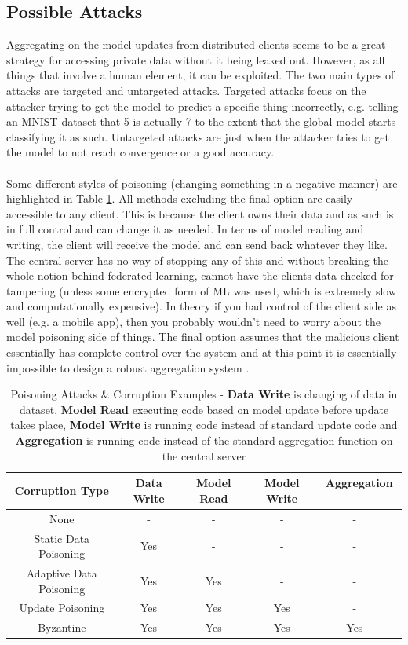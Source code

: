 \subsection{Possible Attacks}
Aggregating on the model updates from distributed clients seems to be a great strategy for accessing private data without it being leaked out. 
However, as all things that involve a human element, it can be exploited. 
The two main types of attacks are targeted and untargeted attacks.
Targeted attacks focus on the attacker trying to get the model to predict a specific thing incorrectly, e.g. telling an MNIST dataset that 5 is actually 7 to the extent that the global model starts classifying it as such. 
Untargeted attacks are just when the attacker tries to get the model to not reach convergence or a good accuracy.
\\ \\
Some different styles of poisoning (changing something in a negative manner) are highlighted in Table \ref{tbl:poisoning}. 
All methods excluding the final option are easily accessible to any client.
This is because the client owns their data and as such is in full control and can change it as needed. 
In terms of model reading and writing, the client will receive the model and can send back whatever they like. 
The central server has no way of stopping any of this and without breaking the whole notion behind federated learning, cannot have the clients data checked for tampering (unless some encrypted form of ML was used, which is extremely slow and computationally expensive). 
In theory if you had control of the client side as well (e.g. a mobile app), then you probably wouldn't need to worry about the model poisoning side of things. 
The final option assumes that the malicious client essentially has complete control over the system and at this point it is essentially impossible to design a robust aggregation system \cite{robagg_fl}.
\begin{center}
    \begin{longtable}{ |c|c|c|c|c| }
    \caption{Poisoning Attacks \& Corruption Examples \cite{robagg_fl} - \textbf{Data Write} is changing of data in dataset, \textbf{Model Read} executing code based on model update before update takes place, \textbf{Model Write} is running code instead of standard update code and \textbf{Aggregation} is running code instead of the standard aggregation function on the central server}
    \label{tbl:poisoning}
    \hline
    \textbf{Corruption Type} & \textbf{Data Write} & \textbf{Model Read} & \textbf{Model Write} & \textbf{Aggregation} \ \\ \hline
    None & - & - & - & - \ \\ \hline
    Static Data Poisoning & Yes & - & - & - \ \\ \hline
    Adaptive Data Poisoning & Yes & Yes & - & - \ \\ \hline
    Update Poisoning & Yes & Yes & Yes & - \ \\ \hline
    Byzantine & Yes & Yes & Yes & Yes \ \\ \hline
    \end{longtable}
\end{center}
